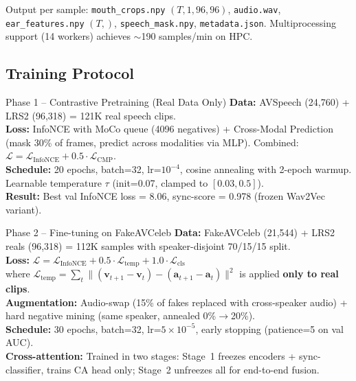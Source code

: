 \documentclass[12pt, letterpaper]{article}
\begin{document}
Output per sample: \texttt{mouth\_crops.npy} $(T, 1, 96, 96)$, \texttt{audio.wav}, \texttt{ear\_features.npy} $(T,)$, \texttt{speech\_mask.npy}, \texttt{metadata.json}. Multiprocessing support (14 workers) achieves $\sim$190 samples/min on HPC.

\subsection{Training Protocol}

\begin{infobox}{Phase 1 -- Contrastive Pretraining (Real Data Only)}
\textbf{Data:} AVSpeech (24,760) + LRS2 (96,318) = 121K real speech clips.\\
\textbf{Loss:} InfoNCE with MoCo queue (4096 negatives) + Cross-Modal Prediction (mask 30\% of frames, predict across modalities via MLP). Combined: $\mathcal{L} = \mathcal{L}_\text{InfoNCE} + 0.5 \cdot \mathcal{L}_\text{CMP}$.\\
\textbf{Schedule:} 20 epochs, batch=32, lr=$10^{-4}$, cosine annealing with 2-epoch warmup. Learnable temperature $\tau$ (init=0.07, clamped to $[0.03, 0.5]$).\\
\textbf{Result:} Best val InfoNCE loss = 8.06, sync-score = 0.978 (frozen Wav2Vec variant).
\end{infobox}

\begin{infobox}{Phase 2 -- Fine-tuning on FakeAVCeleb}
\textbf{Data:} FakeAVCeleb (21,544) + LRS2 reals (96,318) = 112K samples with speaker-disjoint 70/15/15 split.\\
\textbf{Loss:} $\mathcal{L} = \mathcal{L}_\text{InfoNCE} + 0.5 \cdot \mathcal{L}_\text{temp} + 1.0 \cdot \mathcal{L}_\text{cls}$\\
where $\mathcal{L}_\text{temp} = \sum_t \|(\mathbf{v}_{t+1} - \mathbf{v}_t) - (\mathbf{a}_{t+1} - \mathbf{a}_t)\|^2$ is applied \textbf{only to real clips}.\\
\textbf{Augmentation:} Audio-swap (15\% of fakes replaced with cross-speaker audio) + hard negative mining (same speaker, annealed 0\%$\to$20\%).\\
\textbf{Schedule:} 30 epochs, batch=32, lr=$5 \times 10^{-5}$, early stopping (patience=5 on val AUC).\\
\textbf{Cross-attention:} Trained in two stages: Stage~1 freezes encoders + sync-classifier, trains CA head only; Stage~2 unfreezes all for end-to-end fusion.
\end{infobox}
\end{document}
